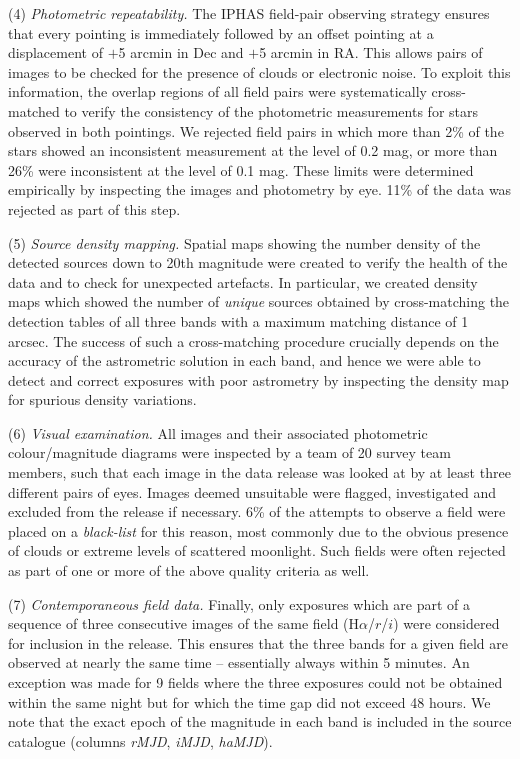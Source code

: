 \documentclass[useAMS,usenatbib]{mn2e}
\begin{document}
(4) \emph{Photometric repeatability.} 
The IPHAS field-pair observing strategy 
ensures that every pointing is immediately followed 
by an offset pointing at a displacement of $+$5 arcmin in Dec 
and $+$5 arcmin in RA.
This allows pairs of images to be checked 
for the presence of clouds or electronic noise.
To exploit this information,
the overlap regions of all field pairs were systematically cross-matched
to verify the consistency of the photometric measurements
for stars observed in both pointings.
We rejected field pairs in which more than 2\% of the stars 
showed an inconsistent measurement at the level of 0.2 mag,
or more than 26\% were inconsistent at the level of 0.1 mag.
These limits were determined empirically by inspecting
the images and photometry by eye.
11\% of the data was rejected as part of this step.

(5) \emph{Source density mapping.}
Spatial maps showing the number density of the detected sources
down to 20th magnitude were created to verify the health
of the data and to check for unexpected artefacts.
In particular, we created density maps
which showed the number of \emph{unique} sources
obtained by cross-matching the detection tables of
all three bands with a maximum matching distance of 1 arcsec.
The success of such a cross-matching procedure crucially depends
on the accuracy of the astrometric solution in each band,
and hence we were able to detect and correct
exposures with poor astrometry by inspecting the density map
for spurious density variations.

(6) \emph{Visual examination.}
All images and their associated photometric colour/magnitude diagrams
were inspected by a team of 20 survey team members, 
such that each image in the data release 
was looked at by at least three different pairs of eyes.
Images deemed unsuitable were flagged, investigated and
excluded from the release if necessary. 
6\% of the attempts to observe a field
were placed on a \emph{black-list}
for this reason, most commonly due to the obvious presence
of clouds or extreme levels of scattered moonlight.
Such fields were often rejected as part of 
one or more of the above quality criteria as well.

(7) \emph{Contemporaneous field data.} 
Finally, only exposures which are part of a sequence 
of three consecutive images of the same field (H$\alpha$/$r$/$i$) 
were considered for inclusion in the release. 
This ensures that the three bands for a given field
are observed at nearly the same time --  
essentially always within 5 minutes.
An exception was made for 9 fields where the three exposures 
could not be obtained within the same night
but for which the time gap did not exceed 48 hours.
We note that the exact epoch of the magnitude in each band
is included in the source catalogue
(columns \emph{rMJD}, \emph{iMJD}, \emph{haMJD}).
\end{document}
